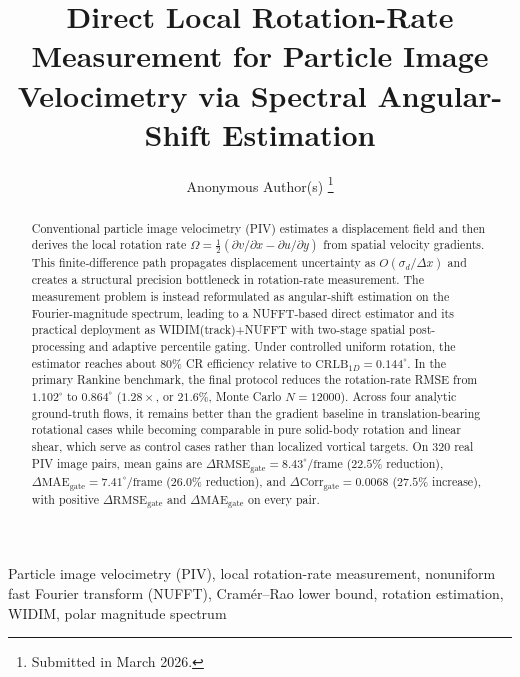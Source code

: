 \documentclass[lettersize,journal]{IEEEtran}
\newcommand{\CRLB}{\mathrm{CRLB}}
\begin{document}

\title{Direct Local Rotation-Rate Measurement for Particle Image Velocimetry via
  Spectral Angular-Shift Estimation}

\author{Anonymous Author(s)%
  \thanks{Submitted in March 2026.}}

\maketitle

\begin{abstract}
Conventional particle image velocimetry (PIV) estimates a displacement field and then derives the local rotation rate
$\Omega=\tfrac{1}{2}(\partial v/\partial x-\partial u/\partial y)$ from spatial velocity gradients.
This finite-difference path propagates displacement uncertainty as $O(\sigma_d/\Delta x)$ and creates a structural precision bottleneck in rotation-rate measurement.
The measurement problem is instead reformulated as angular-shift estimation on the Fourier-magnitude spectrum, leading to a NUFFT-based direct estimator and its practical deployment as WIDIM(track)+NUFFT with two-stage spatial post-processing and adaptive percentile gating.
Under controlled uniform rotation, the estimator reaches about $80\%$ CR efficiency relative to $\CRLB_{1D}=0.144^\circ$. In the primary Rankine benchmark, the final protocol reduces the rotation-rate RMSE from $1.102^\circ$ to $0.864^\circ$ ($1.28\times$, or $21.6\%$, Monte Carlo $N=12000$). Across four analytic ground-truth flows, it remains better than the gradient baseline in translation-bearing rotational cases while becoming comparable in pure solid-body rotation and linear shear, which serve as control cases rather than localized vortical targets.
On 320 real PIV image pairs, mean gains are $\Delta\mathrm{RMSE}_{\mathrm{gate}}=8.43^\circ/\mathrm{frame}$ ($22.5\%$ reduction), $\Delta\mathrm{MAE}_{\mathrm{gate}}=7.41^\circ/\mathrm{frame}$ ($26.0\%$ reduction), and $\Delta\mathrm{Corr}_{\mathrm{gate}}=0.0068$ ($27.5\%$ increase), with positive $\Delta\mathrm{RMSE}_{\mathrm{gate}}$ and $\Delta\mathrm{MAE}_{\mathrm{gate}}$ on every pair.
\end{abstract}

\begin{IEEEkeywords}
Particle image velocimetry (PIV), local rotation-rate measurement, nonuniform fast Fourier transform (NUFFT),
Cram\'{e}r--Rao lower bound, rotation estimation, WIDIM, polar magnitude spectrum
\end{IEEEkeywords}
\end{document}
